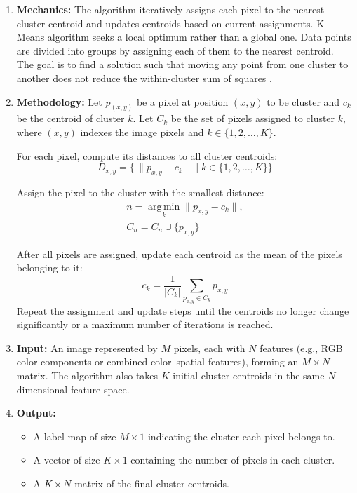 \documentclass[conference]{IEEEtran}
\begin{document}
	\begin{enumerate}
		\item \textbf{Mechanics:} 
			The algorithm iteratively assigns each pixel to the nearest cluster centroid and updates centroids based on current assignments. K-Means algorithm seeks a local optimum rather than a global one. Data points are divided into groups by assigning each of them to the nearest centroid. The goal is to find a solution such that moving any point from one cluster to another does not reduce the within-cluster sum of squares \cite{hartigan1979kmeans}.
						
		\item \textbf{Methodology:}
			Let $p_(x,y)$ be a pixel at position $(x, y)$ to be cluster and $c_k$ be the centroid of cluster $k$.
			Let $C_k$ be the set of pixels assigned to cluster $k$, where $(x, y)$ indexes the image pixels and $k \in \{1, 2, \ldots, K\}$.
			
			For each pixel, compute its distances to all cluster centroids:
			\[
	    	D_{x,y} = \{\, \| p_{x,y} - c_k \| \mid k \in \{1, 2, \ldots, K\} \}
			\]
			
	    	Assign the pixel to the cluster with the smallest distance:
			\begin{gather*}
				n = \operatorname*{arg\,min}_k \| p_{x,y} - c_k \|, \\
				C_n = C_n \cup \{p_{x,y}\}
			\end{gather*}
			
			After all pixels are assigned, update each centroid as the mean of the pixels belonging to it:
			\[
			c_k = \frac{1}{|C_k|} \sum_{p_{x,y} \in C_k} p_{x,y}
			\]
			Repeat the assignment and update steps until the centroids no longer change significantly or a maximum number of iterations is reached.
			
		\item \textbf{Input:} 
			An image represented by $M$ pixels, each with $N$ features (e.g., RGB color components or combined color–spatial features), forming an $M \times N$ matrix. The algorithm also takes $K$ initial cluster centroids in the same $N$-dimensional feature space.
		
		\item \textbf{Output:} 
		\begin{itemize}
			\item A label map of size $M \times 1$ indicating the cluster each pixel belongs to.  
			\item A vector of size $K \times 1$ containing the number of pixels in each cluster.  
			\item A $K \times N$ matrix of the final cluster centroids.  
		\end{itemize}
		

\end{enumerate}
\end{document}
